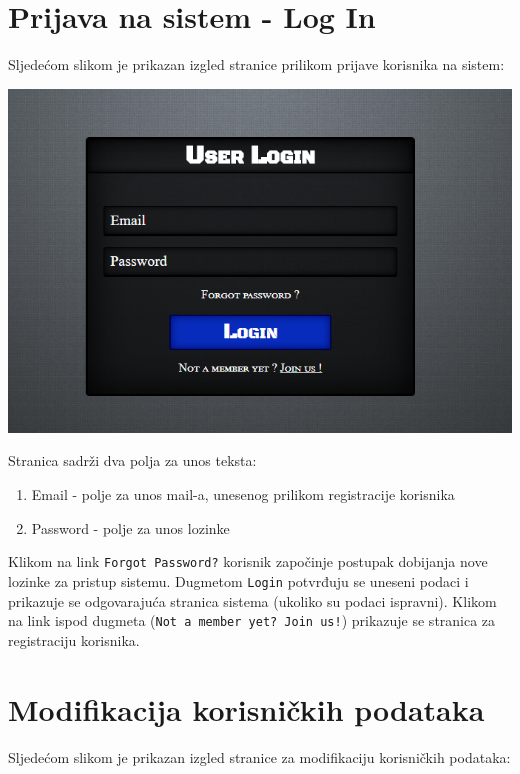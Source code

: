 \section{Prijava na sistem - Log In}

Sljedećom slikom je prikazan izgled stranice prilikom prijave korisnika na sistem:

\begin{center}
    \includegraphics[scale=0.6]{images/Login.png}
\end{center}

Stranica sadrži dva polja za unos teksta:
\begin{enumerate}
    \item Email - polje za unos mail-a, unesenog prilikom registracije korisnika
    \item Password - polje za unos lozinke
\end{enumerate}

Klikom na link \texttt{Forgot Password?} korisnik započinje postupak dobijanja nove lozinke za pristup sistemu. Dugmetom \texttt{Login} potvrđuju se uneseni podaci i prikazuje se odgovarajuća stranica sistema (ukoliko su podaci ispravni). Klikom na link ispod dugmeta (\texttt{Not a member yet? Join us!}) prikazuje se stranica za registraciju korisnika.

\newpage
\section{Modifikacija korisničkih podataka}

Sljedećom slikom je prikazan izgled stranice za modifikaciju korisničkih podataka:

